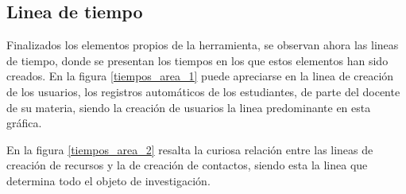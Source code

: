 %

%

\subsection{Linea de tiempo}
Finalizados los elementos propios de la herramienta, se observan ahora las
lineas de tiempo, donde se presentan los tiempos en los que estos elementos han
sido creados.
En la figura \ref{tiempos_area_1} puede apreciarse en la linea de creación de
los usuarios, los registros automáticos de los estudiantes, de parte del
docente de su materia, siendo la creación de usuarios la linea predominante en
esta gráfica.

%

En la figura \ref{tiempos_area_2} resalta la curiosa relación entre las lineas
de creación de recursos y la de creación de contactos, siendo esta la linea que
determina todo el objeto de investigación.

%


